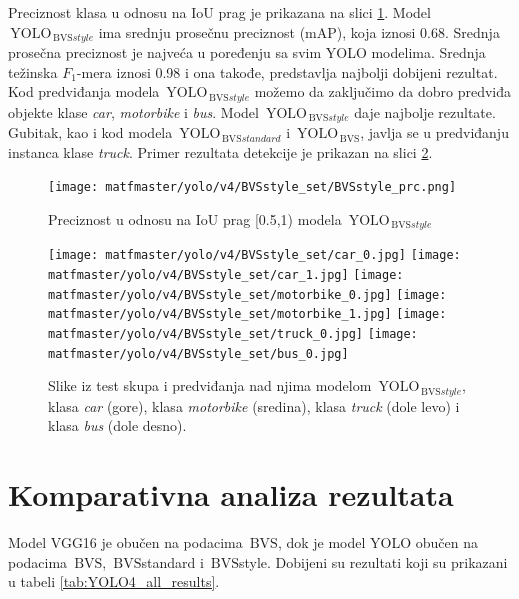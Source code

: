 \documentclass[12pt,oneside]{memoir}
\newcommand{\yolo}{\ensuremath{\,\textrm{YOLO}}}
\newcommand{\bvs}{\ensuremath{\,\textrm{BVS}}}
\begin{document}
\clearpage
Preciznost klasa u odnosu na IoU prag je prikazana na slici \ref{fig:YOLO4_BVSstyle_prc}. Model $\yolo_{\bvs{style}}$ ima srednju prosečnu preciznost (mAP), koja iznosi 0.68. Srednja prosečna preciznost je najveća u poređenju sa svim YOLO modelima. Srednja težinska $F_1$-mera iznosi 0.98 i ona takođe, predstavlja najbolji dobijeni rezultat. Kod predviđanja modela $\yolo_{\bvs{style}}$ možemo da zaključimo da dobro predviđa objekte klase \textit{car}, \textit{motorbike} i \textit{bus}. Model $\yolo_{\bvs{style}}$ daje najbolje rezultate. Gubitak, kao i kod modela $\yolo_{\bvs{standard}}$ i $\yolo_{\bvs}$, javlja se u predviđanju instanca klase \textit{truck}. Primer rezultata detekcije je prikazan na slici \ref{fig:YOLO4_BVSstyle_predictions}.



\begin{figure}[!ht]
    \centering
    \texttt{[image: matfmaster/yolo/v4/BVSstyle\_set/BVSstyle\_prc.png]}
    \caption{Preciznost u odnosu na IoU prag [0.5,1) modela $\yolo_{\bvs{style}}$}
    \label{fig:YOLO4_BVSstyle_prc}
\end{figure}


\begin{figure}[!htbp]
\centering
  \texttt{[image: matfmaster/yolo/v4/BVSstyle\_set/car\_0.jpg]}
  \texttt{[image: matfmaster/yolo/v4/BVSstyle\_set/car\_1.jpg]}
  \texttt{[image: matfmaster/yolo/v4/BVSstyle\_set/motorbike\_0.jpg]}
  \texttt{[image: matfmaster/yolo/v4/BVSstyle\_set/motorbike\_1.jpg]}
  \texttt{[image: matfmaster/yolo/v4/BVSstyle\_set/truck\_0.jpg]}
  \texttt{[image: matfmaster/yolo/v4/BVSstyle\_set/bus\_0.jpg]}
\caption{Slike iz test skupa i predviđanja nad njima modelom $\yolo_{\bvs{style}}$, klasa \textit{car} (gore), klasa \textit{motorbike} (sredina), klasa \textit{truck} (dole levo) i klasa \textit{bus} (dole desno).}
\label{fig:YOLO4_BVSstyle_predictions}
\end{figure}


\clearpage
\section{Komparativna analiza rezultata}

Model VGG16 je obučen na podacima \bvs{}, dok je model YOLO obučen na podacima \bvs, \bvs{standard} i \bvs{style}. Dobijeni su rezultati koji su prikazani u tabeli \ref{tab:YOLO4_all_results}.
\end{document}
